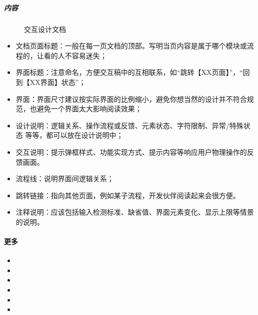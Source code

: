 \documentclass[letterpaper,10pt,english]{sphinxmanual}
\begin{document}
\subparagraph{内容}
\label{\detokenize{chapter_knowledge/static_page:id7}}
\begin{figure}[H]
\centering
\capstart

\noindent{}
\caption{交互设计文档}\label{\detokenize{chapter_knowledge/static_page:id16}}\end{figure}
\begin{itemize}
\item {} 
文档页面标题：一般在每一页文档的顶部。写明当页内容是属于哪个模块或流程的，让看的人不容易迷失；

\item {} 
界面标题：注意命名，方便交互稿中的互相联系，如“跳转【XX页面】”，“回到【XX界面】状态”；

\item {} 
界面：界面尺寸建议按实际界面的比例缩小，避免你想当然的设计并不符合规范，也避免一个界面太大影响阅读效果；

\item {} 
设计说明：逻辑关系、操作流程或反馈、元素状态、字符限制、异常/特殊状态
等等，都可以放在设计说明中；

\item {} 
交互说明：提示弹框样式、功能实现方式、提示内容等响应用户物理操作的反馈画面。

\item {} 
流程线：说明界面间逻辑关系；

\item {} 
跳转链接：指向其他页面，例如某子流程，开发伙伴阅读起来会很方便。

\item {} 
注释说明：应该包括输入检测标准、缺省值、界面元素变化、显示上限等情景的说明。

\end{itemize}


\paragraph{更多}
\label{\detokenize{chapter_knowledge/static_page:id8}}\begin{itemize}
\item {} 

\item {} 

\item {} 

\item {} 

\item {} 

\item {} 

\end{itemize}
\end{document}
